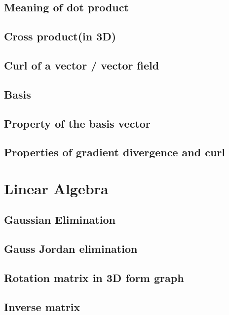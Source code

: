 \subsection{Meaning of dot product}



\subsection{Cross product(in 3D)}


\subsection{Curl of a vector / vector field}


\subsection{Basis}


\subsection{Property of the basis vector}


\subsection{Properties of gradient divergence and curl}


\section{Linear Algebra}


\subsection{Gaussian Elimination}


\subsection{Gauss Jordan elimination}



\subsection{Rotation matrix in 3D form graph}



\subsection{Inverse matrix}



